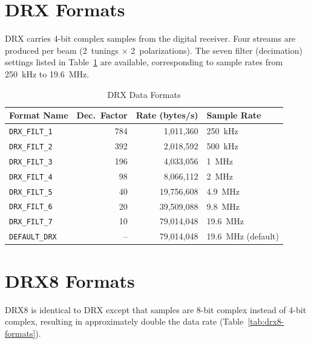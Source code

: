 \section{DRX Formats}

DRX carries 4-bit complex samples from the digital receiver.  Four streams
are produced per beam (2~tunings $\times$ 2~polarizations).  The seven filter
(decimation) settings listed in Table~\ref{tab:drx-formats} are available, corresponding to sample rates from
250~kHz to 19.6~MHz.

\begin{longtable}{l r r l}
\caption{DRX Data Formats}
\label{tab:drx-formats} \\
\toprule
\textbf{Format Name} & \textbf{Dec.\ Factor} & \textbf{Rate (bytes/s)}
    & \textbf{Sample Rate} \\
\midrule
\endfirsthead
\endhead
\bottomrule
\endfoot

\texttt{DRX\_FILT\_1}  & 784 &   1,011,360 & 250~kHz  \\
\texttt{DRX\_FILT\_2}  & 392 &   2,018,592 & 500~kHz  \\
\texttt{DRX\_FILT\_3}  & 196 &   4,033,056 & 1~MHz    \\
\texttt{DRX\_FILT\_4}  &  98 &   8,066,112 & 2~MHz    \\
\texttt{DRX\_FILT\_5}  &  40 &  19,756,608 & 4.9~MHz  \\
\texttt{DRX\_FILT\_6}  &  20 &  39,509,088 & 9.8~MHz  \\
\texttt{DRX\_FILT\_7}  &  10 &  79,014,048 & 19.6~MHz \\
\texttt{DEFAULT\_DRX}  &  -- &  79,014,048 & 19.6~MHz (default) \\

\end{longtable}

\section{DRX8 Formats}

DRX8 is identical to DRX except that samples are 8-bit complex instead of
4-bit complex, resulting in approximately double the data rate
(Table~\ref{tab:drx8-formats}).

